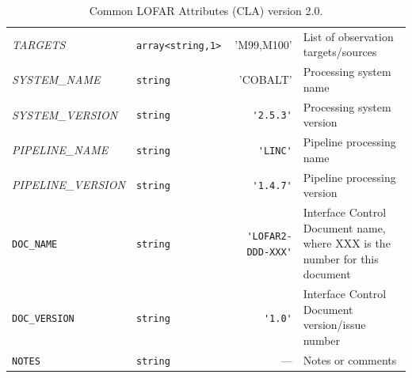 \begin{table}[htbp]
\begin{tabular}{|lp{1.5cm}rp{5cm}|}
    \small{\textit{TARGETS}} & \small\verb|array<string,1>| & 'M99,M100'  &  List of observation targets/sources \\
    \small{\textit{SYSTEM\_NAME}} & \small\verb|string| & 'COBALT'  &  Processing system name \\
    \small{\textit{SYSTEM\_VERSION}} & \small\verb|string| & \verb|'2.5.3'|  &  Processing system version \\
    \small{\textit{PIPELINE\_NAME}}  & \small\verb|string|  & \verb|'LINC'|  &  Pipeline processing name \\
    \small{\textit{PIPELINE\_VERSION}} & \small\verb|string|  & \verb|'1.4.7'|  &  Pipeline processing version \\
    \small \verb|DOC_NAME| & \small\verb|string|  & \verb|'LOFAR2-DDD-XXX'|  &  Interface Control Document name, where XXX is the number for this document \\
    \small \verb|DOC_VERSION| & \small\verb|string|  & \verb|'1.0'|  &  Interface Control Document version/issue number \\
    \small \verb|NOTES| & \small\verb|string|  & ---  &  Notes or comments \\
   \hline
  \end{tabular}
  \caption{Common LOFAR Attributes (CLA) version 2.0.}
  \label{tab:lofar common metadata}
\end{table}
